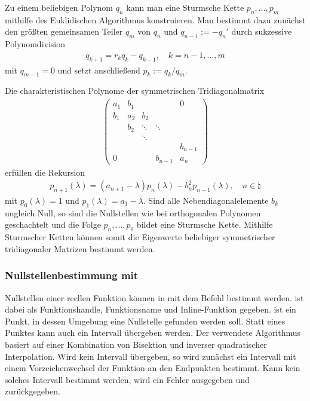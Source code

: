 \linie

Zu einem beliebigen Polynom $q_n$ kann man eine Sturmsche Kette
$p_n, \dotsc, p_m$ mithilfe des Euklidischen Algorithmus konstruieren.
Man bestimmt dazu zunächst den größten gemeinsamen Teiler $q_m$ von $q_n$
und $q_{n-1} := -q_n'$ durch sukzessive Polynomdivision
\begin{align*}
    q_{k+1} = r_k q_k - q_{k-1}, \quad
    k = n - 1, \dotsc, m
\end{align*}
mit $q_{m-1} = 0$ und setzt anschließend $p_k := q_k / q_m$.

\linie

Die charakteristischen Polynome der symmetrischen Tridiagonalmatrix
\begin{align*}
    \begin{pmatrix}
        a_1 & b_1 & & & 0 \\
        b_1 & a_2 & b_2 \\
        & b_2 & \ddots & \ddots \\
        & & \ddots \\
        & & & & b_{n-1} \\
        0 & & & b_{n-1} & a_n
    \end{pmatrix}
\end{align*}
erfüllen die Rekursion
\begin{align*}
    p_{n+1}(\lambda) = (a_{n+1} - \lambda) p_n(\lambda) -
    b_n^2 p_{n-1}(\lambda), \quad
    n \in \natural
\end{align*}
mit $p_0(\lambda) = 1$ und $p_1(\lambda) = a_1 - \lambda$.
Sind alle Nebendiagonalelemente $b_k$ ungleich Null, so sind die Nullstellen
wie bei orthogonalen Polynomen geschachtelt und die Folge
$p_n, \dotsc, p_0$ bildet eine Sturmsche Kette.
Mithilfe Sturmscher Ketten können somit die Eigenwerte beliebiger
symmetrischer tridiagonaler Matrizen bestimmt werden.

\subsubsection{%
    Nullstellenbestimmung mit \matlab{}%
}

Nullstellen einer reellen Funktion  können in \matlab{} mit dem Befehl
 bestimmt werden.
 ist dabei als Funktionshandle, Funktionsname und Inline-Funktion
gegeben.
 ist ein Punkt, in dessen Umgebung eine Nullstelle gefunden werden
soll.
Statt eines Punktes kann auch ein Intervall \code{[a, b]} übergeben werden.
Der verwendete Algorithmus basiert auf einer Kombination von Bisektion und
inverser quadratischer Interpolation.
Wird kein Intervall übergeben, so wird zunächst ein Intervall mit einem
Vorzeichenwechsel der Funktion an den Endpunkten bestimmt.
Kann kein solches Intervall bestimmt werden, wird ein Fehler ausgegeben
und  zurückgegeben.

